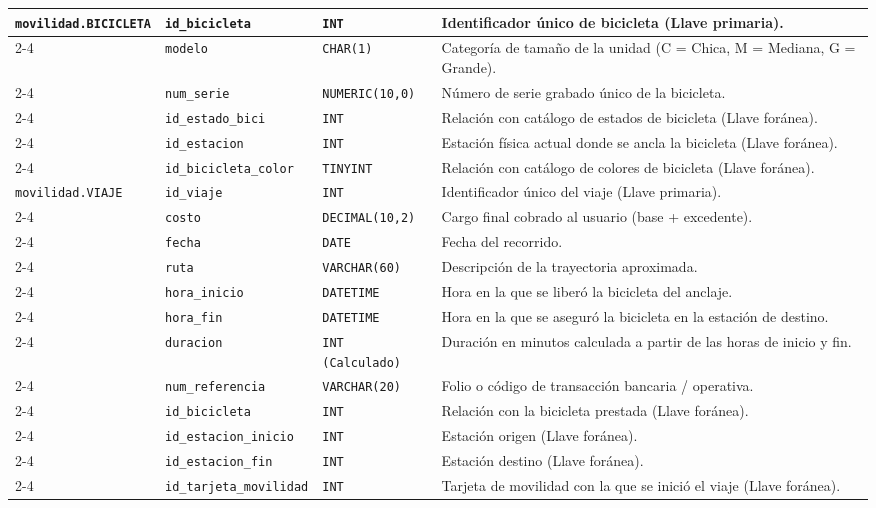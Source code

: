 \begin{longtable}{|p{3.2cm}|p{2.7cm}|p{3.0cm}|p{6.0cm}|}
	\texttt{movilidad.BICICLETA} & \texttt{id\_bicicleta} & \texttt{INT} & Identificador único de bicicleta (Llave primaria). \\ \cline{2-4}
	& \texttt{modelo} & \texttt{CHAR(1)} & Categoría de tamaño de la unidad (C = Chica, M = Mediana, G = Grande). \\ \cline{2-4}
	& \texttt{num\_serie} & \texttt{NUMERIC(10,0)} & Número de serie grabado único de la bicicleta. \\ \cline{2-4}
	& \texttt{id\_estado\_bici} & \texttt{INT} & Relación con catálogo de estados de bicicleta (Llave foránea). \\ \cline{2-4}
	& \texttt{id\_estacion} & \texttt{INT} & Estación física actual donde se ancla la bicicleta (Llave foránea). \\ \cline{2-4}
	& \texttt{id\_bicicleta\_color} & \texttt{TINYINT} & Relación con catálogo de colores de bicicleta (Llave foránea). \\ \hline
	
	\texttt{movilidad.VIAJE} & \texttt{id\_viaje} & \texttt{INT} & Identificador único del viaje (Llave primaria). \\ \cline{2-4}
	& \texttt{costo} & \texttt{DECIMAL(10,2)} & Cargo final cobrado al usuario (base + excedente). \\ \cline{2-4}
	& \texttt{fecha} & \texttt{DATE} & Fecha del recorrido. \\ \cline{2-4}
	& \texttt{ruta} & \texttt{VARCHAR(60)} & Descripción de la trayectoria aproximada. \\ \cline{2-4}
	& \texttt{hora\_inicio} & \texttt{DATETIME} & Hora en la que se liberó la bicicleta del anclaje. \\ \cline{2-4}
	& \texttt{hora\_fin} & \texttt{DATETIME} & Hora en la que se aseguró la bicicleta en la estación de destino. \\ \cline{2-4}
	& \texttt{duracion} & \texttt{INT (Calculado)} & Duración en minutos calculada a partir de las horas de inicio y fin. \\ \cline{2-4}
	& \texttt{num\_referencia} & \texttt{VARCHAR(20)} & Folio o código de transacción bancaria / operativa. \\ \cline{2-4}
	& \texttt{id\_bicicleta} & \texttt{INT} & Relación con la bicicleta prestada (Llave foránea). \\ \cline{2-4}
	& \texttt{id\_estacion\_inicio} & \texttt{INT} & Estación origen (Llave foránea). \\ \cline{2-4}
	& \texttt{id\_estacion\_fin} & \texttt{INT} & Estación destino (Llave foránea). \\ \cline{2-4}
	& \texttt{id\_tarjeta\_movilidad} & \texttt{INT} & Tarjeta de movilidad con la que se inició el viaje (Llave foránea). \\ \hline
	

\end{longtable}
